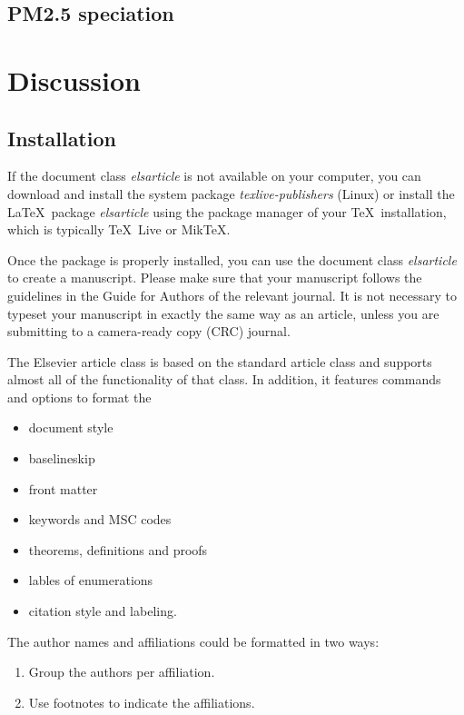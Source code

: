  \subsection{PM2.5 speciation} 

\section{Discussion}
\label{sec:discussion}  


  \subsection{Installation} 
    If the document class \emph{elsarticle} is not available on your computer, you can download and install the system package \emph{texlive-publishers} (Linux) or install the \LaTeX\ package \emph{elsarticle} using the package manager of your \TeX\ installation, which is typically \TeX\ Live or Mik\TeX.

    Once the package is properly installed, you can use the document class \emph{elsarticle} to create a manuscript. Please make sure that your manuscript follows the guidelines in the Guide for Authors of the relevant journal. It is not necessary to typeset your manuscript in exactly the same way as an article, unless you are submitting to a camera-ready copy (CRC) journal.

    The Elsevier article class is based on the standard article class and supports almost all of the functionality of that class. In addition, it features commands and options to format the
    \begin{itemize}
      \item document style
      \item baselineskip
      \item front matter
      \item keywords and MSC codes
      \item theorems, definitions and proofs
      \item lables of enumerations
      \item citation style and labeling.
    \end{itemize}

    The author names and affiliations could be formatted in two ways:
    
    \begin{enumerate}[(1)]
      \item Group the authors per affiliation.
      \item Use footnotes to indicate the affiliations.
    \end{enumerate}
    

